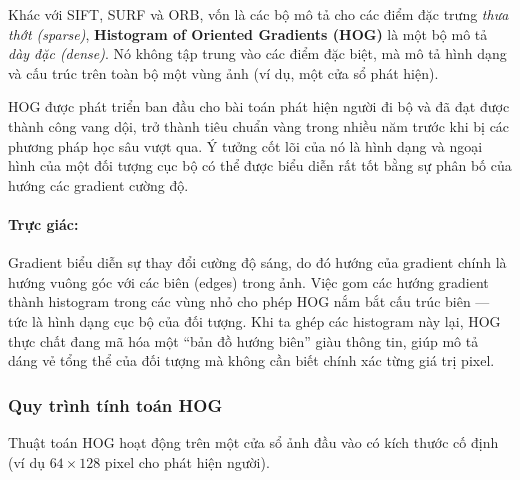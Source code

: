 Khác với SIFT, SURF và ORB, vốn là các bộ mô tả cho các điểm đặc trưng \textit{thưa thớt (sparse)}, \textbf{Histogram of Oriented Gradients (HOG)} \cite{Dalal2005} là một bộ mô tả \textit{dày đặc (dense)}. Nó không tập trung vào các điểm đặc biệt, mà mô tả hình dạng và cấu trúc trên toàn bộ một vùng ảnh (ví dụ, một cửa sổ phát hiện).

HOG được phát triển ban đầu cho bài toán phát hiện người đi bộ và đã đạt được thành công vang dội, trở thành tiêu chuẩn vàng trong nhiều năm trước khi bị các phương pháp học sâu vượt qua. Ý tưởng cốt lõi của nó là hình dạng và ngoại hình của một đối tượng cục bộ có thể được biểu diễn rất tốt bằng sự phân bố của hướng các gradient cường độ.

\paragraph{Trực giác:} 
Gradient biểu diễn sự thay đổi cường độ sáng, do đó hướng của gradient chính là hướng vuông góc với các biên (edges) trong ảnh. 
Việc gom các hướng gradient thành histogram trong các vùng nhỏ cho phép HOG nắm bắt cấu trúc biên — tức là hình dạng cục bộ của đối tượng. 
Khi ta ghép các histogram này lại, HOG thực chất đang mã hóa một “bản đồ hướng biên” giàu thông tin, giúp mô tả dáng vẻ tổng thể của đối tượng mà không cần biết chính xác từng giá trị pixel.

\subsubsection{Quy trình tính toán HOG}
\label{subsubsec:hog_pipeline}
Thuật toán HOG hoạt động trên một cửa sổ ảnh đầu vào có kích thước cố định (ví dụ $64 \times 128$ pixel cho phát hiện người).

